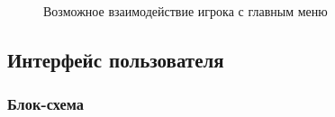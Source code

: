 \documentclass{article}
\begin{document}
\begin{figure}[h]
    \caption{Возможное взаимодействие игрока с главным меню}
    \label{ris:image}
\end{figure}

\subsection{Интерфейс пользователя}
\subsubsection{Блок-схема}
\end{document}
